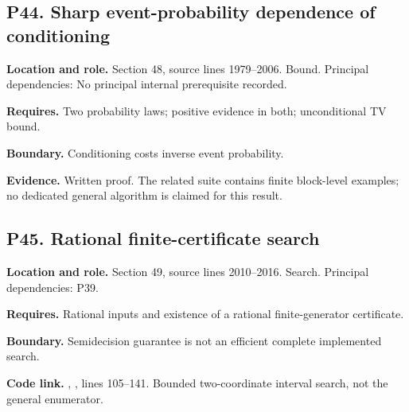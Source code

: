 \documentclass[11pt,letterpaper]{article}
\begin{document}
\par\noindent\begin{minipage}{\textwidth}
\subsection{P44. Sharp event-probability dependence of
conditioning}\label{p44.-sharp-event-probability-dependence-of-conditioning}

\textbf{Location and role.} Section 48, source lines 1979--2006. Bound.
Principal dependencies: No principal internal prerequisite recorded.

\textbf{Requires.} Two probability laws; positive evidence in both;
unconditional TV bound.

\textbf{Boundary.} Conditioning costs inverse event probability.

\textbf{Evidence.} Written proof. The related suite contains finite
block-level examples; no dedicated general algorithm is claimed for this
result.
\end{minipage}\par\medskip

\par\noindent\begin{minipage}{\textwidth}
\subsection{P45. Rational finite-certificate
search}\label{p45.-rational-finite-certificate-search}

\textbf{Location and role.} Section 49, source lines 2010--2016. Search.
Principal dependencies: P39.

\textbf{Requires.} Rational inputs and existence of a rational
finite-generator certificate.

\textbf{Boundary.} Semidecision guarantee is not an efficient complete
implemented search.

\textbf{Code link.} ,
, lines 105--141. Bounded two-coordinate
interval search, not the general enumerator.
\end{minipage}\par\medskip
\end{document}

